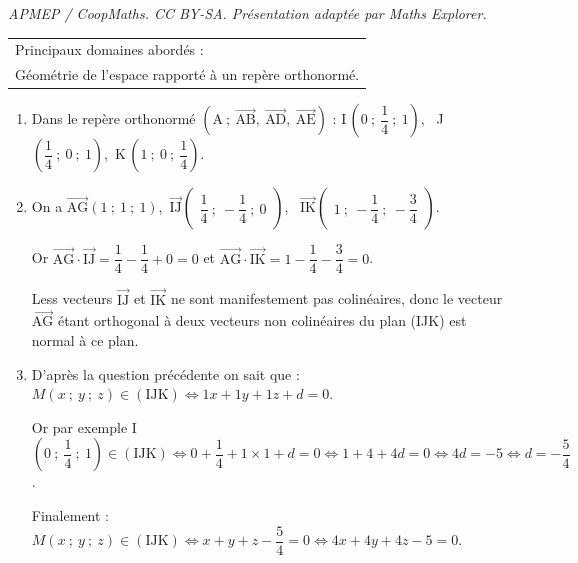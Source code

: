 \documentclass[10pt]{article}
\providecommand{\vect}[1]{\overrightarrow{#1}}
\begin{document}
\noindent\textit{APMEP / CoopMaths. CC BY-SA. Présentation adaptée par Maths Explorer.}\par\medskip
\medskip

\begin{tabular}{|l|}\hline
Principaux domaines abordés :\\
Géométrie de l'espace rapporté à un repère orthonormé.\\ \hline
\end{tabular}

\bigskip













\begin{enumerate}
\item 
Dans le repère orthonormé $\left(\text{A}~;~\vect{\text{AB}},~\vect{\text{AD}},~\vect{\text{AE}}\right)$ : 
I\,$\left(0~;~\dfrac{1}{4}~;~1 \right)$, \, J\,$\left(\dfrac{1}{4}~;~0~;~1 \right)$,\, K\,$\left(1~;~0~;~\dfrac{1}{4}\right)$.
\item 
On a $\vect{\text{AG}} \left (1~;~1~;~1\right )$,\, $\vect{\text{IJ}}\begin{pmatrix}\dfrac{1}{4}~;~- \dfrac{1}{4}~;~0\end{pmatrix}$, \, $\vect{\text{IK}}\begin{pmatrix}1~;~- \dfrac{1}{4}~;~-\dfrac{3}{4}\end{pmatrix}$.

Or $\vect{\text{AG}} \cdot \vect{\text{IJ}} =  \dfrac{1}{4} - \dfrac{1}{4} + 0 = 0$ et $\vect{\text{AG}} \cdot \vect{\text{IK}} = 1 - \dfrac{1}{4} - \dfrac{3}{4} = 0$.

Less vecteurs $\vect{\text{IJ}}$ et $\vect{\text{IK}}$ ne sont manifestement pas colinéaires, donc le vecteur $\vect{\text{AG}}$ étant orthogonal à deux vecteurs non colinéaires du plan (IJK) est normal à ce plan.
\item 
D'après la question précédente on sait que :
$M(x~;~y~;~z) \in (\text{IJK}) \iff 1x + 1y + 1z + d = 0$.

Or par exemple I$\left(0~;~\dfrac{1}{4}~;~1 \right) \in (\text{IJK}) \iff 0 + \dfrac{1}{4} + 1\times 1 + d = 0 \iff 1 + 4 + 4d = 0 \iff 4d = - 5 \iff d = - \dfrac{5}{4}$.

Finalement :
$M(x~;~y~;~z) \in (\text{IJK}) \iff x + y + z - \dfrac{5}{4} = 0 \iff 4x + 4y + 4z - 5 = 0$.


\end{enumerate}
\end{document}
